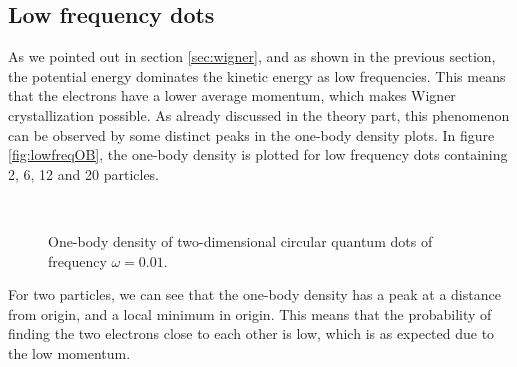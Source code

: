 \newpage
\subsection{Low frequency dots} \label{sec:lowfrequencies}
As we pointed out in section \ref{sec:wigner}, and as shown in the previous section, the potential energy dominates the kinetic energy as low frequencies. This means that the electrons have a lower average momentum, which makes Wigner crystallization possible. As already discussed in the theory part, this phenomenon can be observed by some distinct peaks in the one-body density plots. In figure \eqref{fig:lowfreqOB}, the one-body density is plotted for low frequency dots containing 2, 6, 12 and 20 particles. 

\begin{figure}[H]
	\centering
	\captionsetup[subfigure]{labelformat=empty}
	\hspace{0.1cm}
	\hspace{-0.5cm}
	\hspace{-0.5cm}
	\\ [-0.5cm]
	
	\hspace{0.1cm}
	\hspace{-0.5cm}
	\hspace{-0.5cm}
	
	\caption{One-body density of two-dimensional circular quantum dots of frequency $\omega=0.01$. }
	\label{fig:lowfreqOB}
\end{figure}

For two particles, we can see that the one-body density has a peak at a distance from origin, and a local minimum in origin. This means that the probability of finding the two electrons close to each other is low, which is as expected due to the low momentum. 

